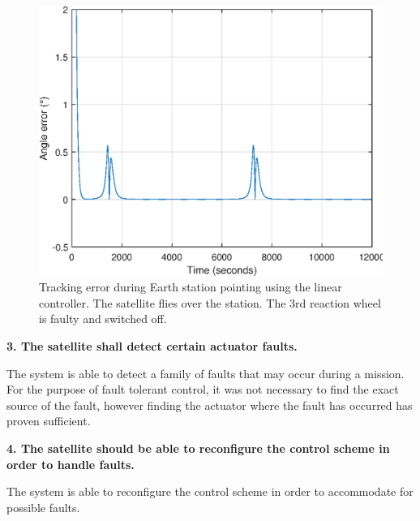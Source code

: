 \begin{figure}[H]
	\centering
	\includegraphics[width=0.7\linewidth]{figures/faultyangerror}
	\caption{Tracking error during Earth station pointing using the linear controller. The satellite flies over the station. The 3rd reaction wheel is faulty and switched off.}
	\label{fig:angle_error2}
\end{figure}



\textbf{3. The satellite shall detect certain actuator faults.}

The system is able to detect a family of faults that may occur during a mission. For the purpose of fault tolerant control, it was not necessary to find the exact source of the fault, however finding the actuator where the fault has occurred has proven sufficient. 

\textbf{4. The satellite should be able to reconfigure the control scheme in order to handle faults.}

The system is able to reconfigure the control scheme in order to accommodate for possible faults.
